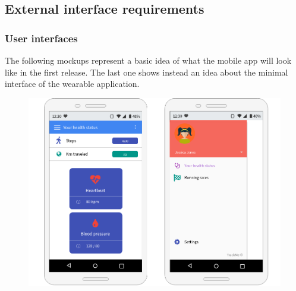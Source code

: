 
%

\subsection{External interface requirements}
\subsubsection{User interfaces}
The following mockups represent a basic idea of what the mobile app will look like in the first release. The last one shows instead an idea about the minimal interface of the wearable application. \newline

\begin{figure}[h!]
\centering
\includegraphics[scale=0.45]{sections/mockups/mockups1,2.png} \newline
{}		
\end{figure}

\clearpage

